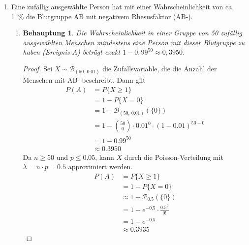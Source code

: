 \documentclass[a4paper]{scrartcl}
\newtheorem*{behaupt}{Behauptung}
\begin{document}
\begin{enumerate}[label=\bfseries\arabic*.]
    \item
        Eine zufällig ausgewählte Person hat mit einer Wahrscheinlichkeit von
        ca. \SI{1}{\percent} die Blutgruppe AB mit negativem Rhesusfaktor (AB-).
        \begin{enumerate}
            \item
                \begin{behaupt}
                    Die Wahrscheinlichkeit in einer Gruppe von 50 zufällig
                    ausgewählten Menschen mindestens eine Person mit dieser
                    Blutgruppe zu haben (Ereignis $A$) beträgt exakt
                    $1 - 0,99^{50} \approx 0,3950$.
                \end{behaupt}
                \begin{proof}
                    Sei $X \sim \mathcal{B}_{(50,\ \num{0,01})}$ die
                    Zufallsvariable, die die Anzahl der Menschen mit AB-
                    beschreibt.
                    Dann gilt
                    \begin{equation*}
                        \begin{split}
                            P(A) &= P\{X \geq 1\} \\
                            &= 1 - P\{X = 0\} \\
                            &= 1 - \mathcal{B}_{(50,\ \num{0,01})} (\{0\}) \\
                            &= 1 - \binom{50}{0} \cdot
                               \num{0,01}^0 \cdot (1 - \num{0,01})^{50 - 0} \\
                            &= 1 - \num{0,99}^{50} \\
                            &\approx \num{0.3950}
                        \end{split}
                    \end{equation*}
                    Da $n \geq 50$ und $p \leq \num{0,05}$, kann $X$ durch die
                    Poisson-Verteilung mit $\lambda = n \cdot p = \num{0,5}$
                    approximiert werden.
                    \begin{equation*}
                        \begin{split}
                            P(A) &= P\{X \geq 1\} \\
                            &= 1 - P\{X = 0\} \\
                            &\approx 1 - \mathcal{P}_{\num{0,5}} (\{0\}) \\
                            &= 1 - e^{-\num{0,5}} \cdot \frac{\num{0,5}^0}{0!} \\
                            &= 1 - e^{-\num{0,5}} \\
                            &\approx \num{0.3935}
                        \end{split}
                    \end{equation*}
                \end{proof}


\end{enumerate}
\end{enumerate}
\end{document}
